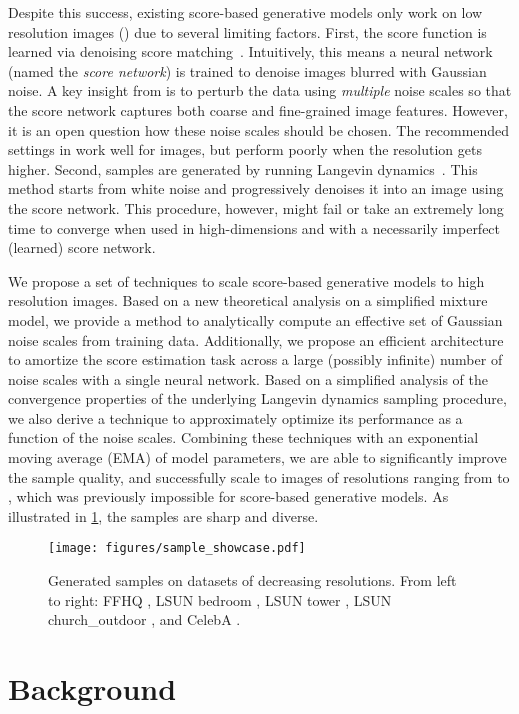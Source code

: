 \documentclass{article}
\begin{document}
Despite this success, existing score-based generative models only work on low resolution images () due to several limiting factors. 
First, the score function is learned via denoising score matching~\cite{hyvarinen2005estimation,vincent2011connection,raphan2011least}. Intuitively, this means a  neural network (named the \emph{score network}) is trained to denoise images blurred with Gaussian noise. A key insight from \cite{song2019generative} is to perturb the data using \emph{multiple} noise scales so that the score network captures both coarse and fine-grained image features. However, it is an open question how these noise scales should be chosen. The recommended settings in \cite{song2019generative} work well for  images, but perform poorly when the resolution gets higher. Second, samples are generated by running Langevin dynamics~\cite{roberts1996exponential,welling2011bayesian}. This method starts from white noise and progressively denoises it into an image using the score network. This procedure, however, might fail or take an extremely long time to converge when used in high-dimensions and with a necessarily imperfect (learned) score network. 






We propose a set of techniques to scale score-based generative models to high resolution images. Based on a new theoretical analysis on a simplified mixture model, we provide a method to analytically compute an effective set of Gaussian noise scales from training data. Additionally, we propose an efficient architecture to amortize the score estimation task across a large (possibly infinite) number of noise scales with a single neural network. Based on a simplified analysis of the convergence properties of the underlying Langevin dynamics sampling procedure, we also derive a technique to approximately optimize its performance as a function of the noise scales. 
Combining these techniques with an exponential moving average (EMA) of model parameters, we are able to significantly improve the sample quality, and successfully scale to images of resolutions ranging from  to , which was previously impossible for score-based generative models. As illustrated in \cref{fig:showcase}, the samples are sharp and diverse. 


\begin{figure}
    \centering
    \texttt{[image: figures/sample\_showcase.pdf]}
    \caption{Generated samples on datasets of decreasing resolutions. From left to right: FFHQ , LSUN bedroom , LSUN tower , LSUN church\_outdoor , and CelebA .}
    \label{fig:showcase}
\end{figure} \section{Background}\label{sec:background}
\end{document}
